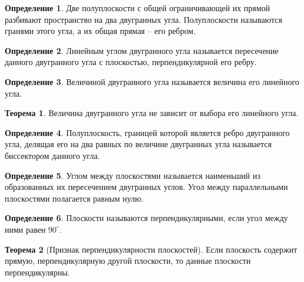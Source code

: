 \documentclass[12pt]{article}
\theoremstyle{definition}
\newtheorem{theorem}{Теорема}[section]
\newtheorem{definition}{Определение}
\begin{document}
\begin{definition}
    Две полуплоскости с общей ограничивающей их прямой разбивают пространство на два двугранных угла. Полуплоскости называются гранями этого угла, а их общая прямая – его ребром.
\end{definition}
\begin{definition}
    Линейным углом двугранного угла называется пересечение данного двугранного угла с плоскостью, перпендикулярной его ребру.
\end{definition}
\begin{definition}
    Величиной двугранного угла называется величина его линейного угла.
\end{definition}
\begin{theorem}
    Величина двугранного угла не зависит от выбора его линейного угла.
\end{theorem}
\begin{definition}
    Полуплоскость, границей которой является ребро двугранного угла, делящая его на два равных по величине двугранных угла называется биссектором данного угла.
\end{definition}
\begin{definition}
    Углом между плоскостями называется наименьший из образованных их пересечением двугранных углов. Угол между параллельными плоскостями полагается равным нулю.
\end{definition}
\begin{definition}
    Плоскости называются перпендикулярными, если угол между ними равен $90^\circ$.
\end{definition}
\begin{theorem}[Признак перпендикулярности плоскостей] Если плоскость содержит прямую, перпендикулярную другой плоскости, то данные плоскости перпендикулярны.
\end{theorem}
\end{document}
